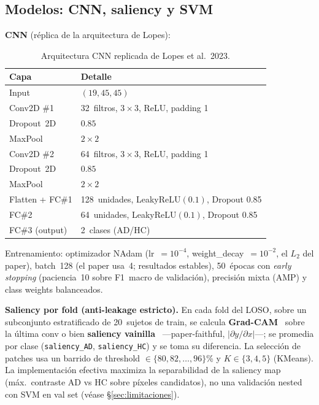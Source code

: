 \documentclass[11pt, a4paper]{article}
\begin{document}
\subsection{Modelos: CNN, saliency y SVM}
\label{sec:modelos}

\textbf{CNN} (réplica de la arquitectura de Lopes):

\begin{table}[H]
\centering
\small
\begin{tabular}{ll}
\toprule
Capa & Detalle \\
\midrule
Input & $(19, 45, 45)$ \\
Conv2D \#1 & 32~filtros, $3\times3$, ReLU, padding 1 \\
Dropout~2D & $0.85$ \\
MaxPool & $2\times2$ \\
Conv2D \#2 & 64~filtros, $3\times3$, ReLU, padding 1 \\
Dropout~2D & $0.85$ \\
MaxPool & $2\times2$ \\
Flatten + FC\#1 & 128~unidades, LeakyReLU$(0.1)$, Dropout 0.85 \\
FC\#2 & 64~unidades, LeakyReLU$(0.1)$, Dropout 0.85 \\
FC\#3 (output) & 2~clases (AD/HC) \\
\bottomrule
\end{tabular}
\caption{Arquitectura CNN replicada de Lopes et al.~2023.}
\end{table}

Entrenamiento: optimizador NAdam (lr~$=10^{-4}$, weight\_decay~$=10^{-2}$,
el $L_2$ del paper), batch~128 (el paper usa~4; resultados estables),
50~épocas con \emph{early stopping}
(paciencia~10 sobre F1~macro de validación), precisión mixta (AMP) y class
weights balanceados.

\textbf{Saliency por fold (anti-leakage estricto).} En cada fold del LOSO,
sobre un subconjunto estratificado de 20~sujetos de train, se calcula
\textbf{Grad-CAM}~\cite{Selvaraju2017} sobre la última conv o bien
\textbf{saliency vainilla}~\cite{Simonyan2014} ---paper-faithful,
$|\partial y/\partial x|$---; se promedia por clase
(\texttt{saliency\_AD}, \texttt{saliency\_HC}) y se toma su diferencia. La
selección de patches usa un barrido de threshold $\in\{80,82,\dots,96\}$\%
y $K\in\{3,4,5\}$ (KMeans). La implementación efectiva maximiza la
separabilidad de la saliency map (máx.\ contraste AD vs HC sobre píxeles
candidatos), no una validación nested con SVM en val set (véase
§\ref{sec:limitaciones}).
\end{document}
